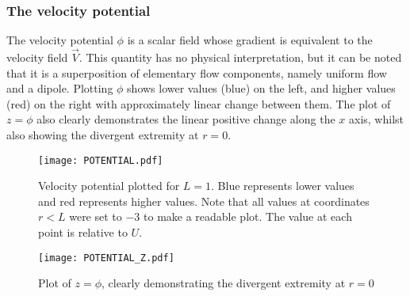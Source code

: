 \subsubsection{The velocity potential}
The velocity potential $\phi$ is a scalar field whose gradient is equivalent to the velocity field $\vec{V}$. This quantity has no
physical interpretation, but it can be noted that it is a superposition of elementary flow components, namely uniform flow and a dipole. Plotting $\phi$ shows lower values (blue) on the left, and higher
values (red) on the right with approximately linear change between them. The plot of $z=\phi$
also clearly demonstrates the linear positive change along the $x$ axis, whilst also showing the divergent extremity at $r=0$.
\begin{figure}
	\centering
	\texttt{[image: POTENTIAL.pdf]}
	\caption{Velocity potential plotted for $L=1$. Blue represents lower values and red represents higher values. Note that all values at coordinates $r<L$ were set to $-3$ to make a readable plot. The value at each point is relative to $U$.}
	\label{figure:VELOCITY-POTENTIAL}
\end{figure}
\begin{figure}
	\centering
	\texttt{[image: POTENTIAL\_Z.pdf]}
	\caption{Plot of $z=\phi$, clearly demonstrating the divergent extremity at $r=0$}
	\label{figure:VELOCITY-POTENTIAL-3D}
\end{figure}

